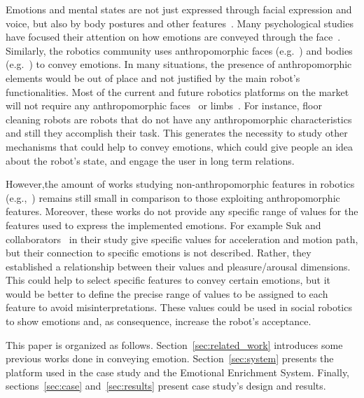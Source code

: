 Emotions and mental states are not just expressed through facial expression and voice, but also by body postures and other features~\cite{Gelder2008}. Many psychological studies have focused their attention on how emotions are conveyed through the face~\cite{kleinsmith2012affective}. Similarly, the robotics community uses anthropomorphic faces (e.g.~\cite{Breazeal2002}) and bodies (e.g.~\cite{Canamero2010}) to convey emotions.
In many situations, the presence of anthropomorphic elements would be out of place and not justified by the main robot's functionalities. Most of the current and future robotics platforms on the market will not require any anthropomorphic faces~\cite{Breazeal2002} or limbs~\cite{Li2011}. For instance, floor cleaning robots are robots that do not have any anthropomorphic characteristics and still they accomplish their task.
This generates the necessity to study other mechanisms that could help to convey emotions, which could give people an idea about the robot's state, and engage the user in long term relations.

However,the amount of works studying non-anthropomorphic features in robotics (e.g.,~\cite{Saerbeck2010}) remains still small in comparison to those exploiting anthropomorphic features. Moreover, these works do not provide any specific range of values for the features used to express the implemented emotions. For example Suk and collaborators~\cite{NAM2014} in their study give specific values for acceleration and motion path, but their connection to specific emotions is not described. Rather, they established a relationship between their values and pleasure/arousal dimensions. This could help to select specific features to convey certain emotions, but it would be better to define the precise range of values to be assigned to each feature to avoid misinterpretations. These values could be used in social robotics to show emotions and, as consequence, increase the robot's acceptance.

This paper is organized as follows. Section~\ref{sec:related_work} introduces some previous works done in conveying emotion. Section~\ref{sec:system} presents the platform used in the case study and the Emotional Enrichment System. Finally, sections~\ref{sec:case} and~\ref{sec:results} present case study's design and results.
